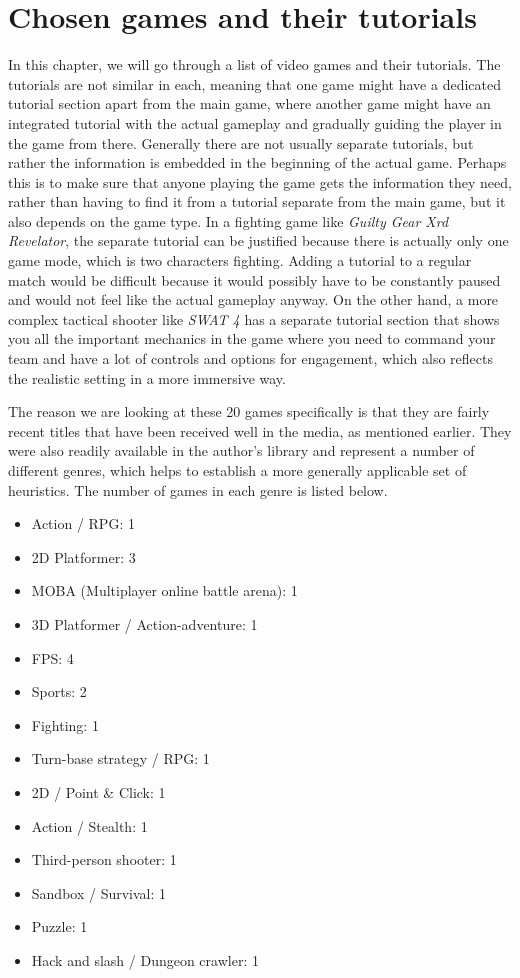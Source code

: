 \chapter{Chosen games and their tutorials}

In this chapter, we will go through a list of video games and their tutorials. The tutorials are not similar in each, meaning that one game might have a dedicated tutorial section apart from the main game, where another game might have an integrated tutorial with the actual gameplay and gradually guiding the player in the game from there. Generally there are not usually separate tutorials, but rather the information is embedded in the beginning of the actual game. Perhaps this is to make sure that anyone playing the game gets the information they need, rather than having to find it from a tutorial separate from the main game, but it also depends on the game type. In a fighting game like \textit{Guilty Gear Xrd Revelator}, the separate tutorial can be justified because there is actually only one game mode, which is two characters fighting. Adding a tutorial to a regular match would be difficult because it would possibly have to be constantly paused and would not feel like the actual gameplay anyway. On the other hand, a more complex tactical  shooter like \textit{SWAT 4} has a separate tutorial section that shows you all the important mechanics in the game where you need to command your team and have a lot of controls and options for engagement, which also reflects the realistic setting in a more immersive way.

The reason we are looking at these 20 games specifically is that they are fairly recent titles that have been received well in the media, as mentioned earlier. They were also readily available in the author's library and represent a number of different genres, which helps to establish a more generally applicable set of heuristics. The number of games in each genre is listed below. 

\begin{itemize}
	\item Action / RPG: 1  
	\item 2D Platformer: 3
	\item MOBA (Multiplayer online battle arena): 1
	\item 3D Platformer / Action-adventure: 1
	\item FPS: 4
	\item Sports: 2
	\item Fighting: 1
	\item Turn-base strategy / RPG: 1
	\item 2D / Point \& Click: 1
	\item Action / Stealth: 1
	\item Third-person shooter: 1
	\item Sandbox / Survival: 1
	\item Puzzle: 1
	\item Hack and slash / Dungeon crawler: 1
\end{itemize}


